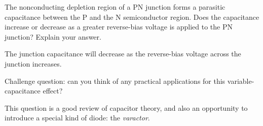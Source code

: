 

The nonconducting depletion region of a PN junction forms a parasitic capacitance between the P and the N semiconductor region.  Does the capacitance increase or decrease as a greater reverse-bias voltage is applied to the PN junction?  Explain your answer.







The junction capacitance will decrease as the reverse-bias voltage across the junction increases.

\vskip 10pt

Challenge question: can you think of any practical applications for this variable-capacitance effect?







This question is a good review of capacitor theory, and also an opportunity to introduce a special kind of diode: the {\it varactor}.




